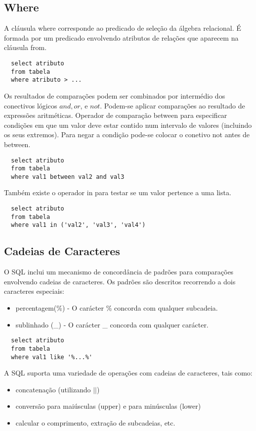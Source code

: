 \documentclass{article}
\begin{document}
\subsection{Where}
A cláusula where corresponde ao predicado de seleção da álgebra relacional. É formada por um predicado envolvendo atributos de relações que aparecem na cláusula from.
\begin{lstlisting}
  select atributo 
  from tabela
  where atributo > ...
\end{lstlisting}
Os resultados de comparações podem ser combinados por intermédio dos conectivos lógicos $and, or$, e $not$. Podem-se aplicar comparações ao resultado de expressões aritméticas. Operador de comparação between para especificar condições em que um valor deve estar contido num intervalo de valores (incluindo os seus extremos). Para negar a condição pode-se colocar o conetivo not antes de between.
\begin{lstlisting}
  select atributo 
  from tabela
  where val1 between val2 and val3
\end{lstlisting}
Também existe o operador in para testar se um valor pertence a uma lista.
\begin{lstlisting}
  select atributo 
  from tabela
  where val1 in ('val2', 'val3', 'val4')
\end{lstlisting}

\subsection{Cadeias de Caracteres}
O SQL inclui um mecanismo de concordância de padrões para comparações envolvendo cadeias de caracteres. Os padrões são descritos recorrendo a dois caracteres especiais:
\begin{itemize}
  \item percentagem(\%) - O carácter \% concorda com qualquer subcadeia.
  \item sublinhado (\_) - O carácter \_ concorda com qualquer carácter.
\end{itemize}
\begin{lstlisting}
  select atributo 
  from tabela
  where val1 like '%...%'
\end{lstlisting}
A SQL suporta uma variedade de operações com cadeias de caracteres, tais como:
\begin{itemize}
  \item concatenação (utilizando $||$)
  \item conversão para maiúsculas (upper) e para minúsculas (lower)
  \item calcular o comprimento, extração de subcadeias, etc.
\end{itemize}
\end{document}
